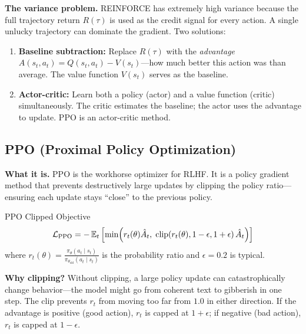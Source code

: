\textbf{The variance problem.} REINFORCE has extremely high variance because the full trajectory return $R(\tau)$ is used as the credit signal for every action. A single unlucky trajectory can dominate the gradient. Two solutions:

\begin{enumerate}
    \item \textbf{Baseline subtraction:} Replace $R(\tau)$ with the \textit{advantage} $A(s_t, a_t) = Q(s_t, a_t) - V(s_t)$---how much better this action was than average. The value function $V(s_t)$ serves as the baseline.
    \item \textbf{Actor-critic:} Learn both a policy (actor) and a value function (critic) simultaneously. The critic estimates the baseline; the actor uses the advantage to update. PPO is an actor-critic method.
\end{enumerate}

\subsection{PPO (Proximal Policy Optimization)}

\textbf{What it is.} PPO is the workhorse optimizer for RLHF. It is a policy gradient method that prevents destructively large updates by clipping the policy ratio---ensuring each update stays ``close'' to the previous policy.

\begin{mathresult}{PPO Clipped Objective}
\begin{equation}
\mathcal{L}_{\text{PPO}} = -\operatorname{\mathbb{E}}_t\left[\min\!\left(r_t(\theta) \hat{A}_t,\; \text{clip}\!\left(r_t(\theta), 1-\epsilon, 1+\epsilon\right)\hat{A}_t\right)\right]
\end{equation}
where $r_t(\theta) = \frac{\pi_\theta(a_t \mid s_t)}{\pi_{\theta_{\text{old}}}(a_t \mid s_t)}$ is the probability ratio and $\epsilon = 0.2$ is typical.
\end{mathresult}

\textbf{Why clipping?} Without clipping, a large policy update can catastrophically change behavior---the model might go from coherent text to gibberish in one step. The clip prevents $r_t$ from moving too far from $1.0$ in either direction. If the advantage is positive (good action), $r_t$ is capped at $1 + \epsilon$; if negative (bad action), $r_t$ is capped at $1 - \epsilon$.

